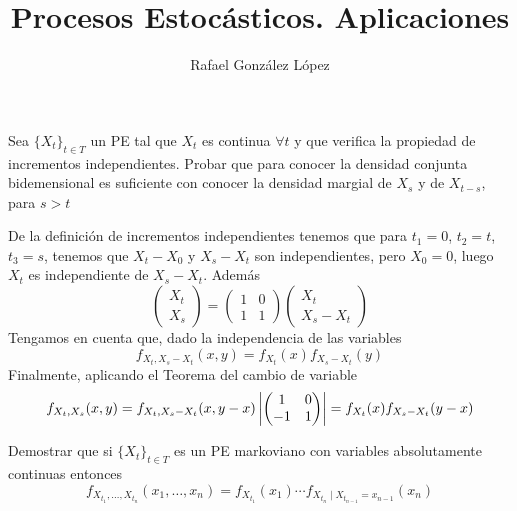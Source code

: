 \documentclass[twoside]{article}
\begin{document}
\title{Procesos Estocásticos. Aplicaciones}
\author{Rafael González López}
\maketitle

\begin{ejercicio}{1}
Sea $\{X_t\}_{t\in T}$ un PE tal que $X_t$ es continua $\forall t$ y que verifica la propiedad de incrementos independientes. Probar que para conocer la densidad conjunta bidemensional es suficiente con conocer la densidad margial de $X_s$ y de $X_{t-s}$, para $s>t$


\end{ejercicio}

\begin{solucion}De la definición de incrementos independientes tenemos que para $t_1 = 0$, $t_2 = t$, $t_3=s$, tenemos que 
$X_t - X_0$ y $X_s - X_t$ son independientes, pero $X_0 =0$, luego $X_t$ es independiente de $X_s-X_t$. Además
$$
\begin{pmatrix}
X_t\\
X_s
\end{pmatrix} = \begin{pmatrix}
1 & 0\\
1 & 1
\end{pmatrix} \begin{pmatrix}
X_t\\
X_s-X_t
\end{pmatrix} 
$$
Tengamos en cuenta que, dado la independencia de las variables
$$
f_{X_t,X_s-X_t}(x,y) = f_{X_t}(x)f_{X_s-X_t}(y)
$$
Finalmente, aplicando el Teorema del cambio de variable
$$
f_{X_t,X_s}(x,y) = f_{X_t,X_s-X_t}(x,y-x)\left\lvert\begin{pmatrix}
1 & 0\\
-1 & 1
\end{pmatrix}\right\rvert = f_{X_t}(x)f_{X_s-X_t}(y-x)
$$
\end{solucion}
\newpage

\begin{ejercicio}{2} Demostrar que si $\{X_t\}_{t\in T}$ es un PE markoviano con variables absolutamente continuas entonces
$$
f_{X_{t_1},\dotsc,X_{t_n}}(x_1,\dotsc,x_n) = f_{X_{t_1}}(x_1)\cdots f_{X_{t_n}\mid X_{t_{n-1}} = x_{n-1}}(x_n)
$$
\end{ejercicio}
\end{document}
